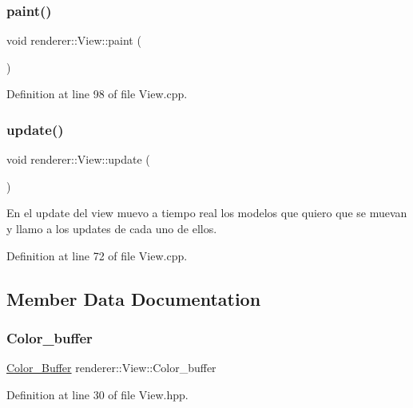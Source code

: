\subsubsection{\texorpdfstring{paint()}{paint()}}
{\footnotesize\ttfamily void renderer\+::\+View\+::paint (\begin{DoxyParamCaption}{ }\end{DoxyParamCaption})}



Definition at line 98 of file View.\+cpp.

\mbox{\label{classrenderer_1_1_view_ac38d65d08ad6ee7348f85a2bf7b03991}} 
\subsubsection{\texorpdfstring{update()}{update()}}
{\footnotesize\ttfamily void renderer\+::\+View\+::update (\begin{DoxyParamCaption}{ }\end{DoxyParamCaption})}

En el update del view muevo a tiempo real los modelos que quiero que se muevan y llamo a los updates de cada uno de ellos. 

Definition at line 72 of file View.\+cpp.



\subsection{Member Data Documentation}
\mbox{\label{classrenderer_1_1_view_a329c014c9553fe1d42e95a1a6dc99d58}} 
\subsubsection{\texorpdfstring{Color\_buffer}{Color\_buffer}}
{\footnotesize\ttfamily \mbox{\hyperlink{classrenderer_1_1_view_a21ded0a0afb4aea559b74d004cee798f}{Color\+\_\+\+Buffer}} renderer\+::\+View\+::\+Color\+\_\+buffer\hspace{0.3cm}{\ttfamily [private]}}



Definition at line 30 of file View.\+hpp.

